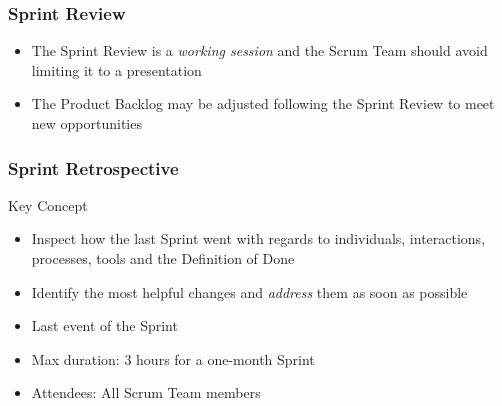 \begin{frame}
	\frametitle{Sprint Review}
	\begin{itemize}
		\setlength\itemsep{0.7em}
		\item The Sprint Review is a \textit{working session} and the Scrum Team should avoid limiting it to a presentation
		\item The Product Backlog may be adjusted following the Sprint Review to meet new opportunities
	\end{itemize}
\end{frame}

\begin{frame}
	\frametitle{Sprint Retrospective}
	\begin{block}{Key Concept}
		\begin{itemize}
			\item Inspect how the last Sprint went with regards to individuals, interactions, processes, tools and the Definition of Done
			\item Identify the most helpful changes and \textit{address} them as soon as possible
		\end{itemize}
	\end{block}
	\vspace{0.5em}
	\begin{itemize}
		\setlength\itemsep{0.7em}
		\item Last event of the Sprint
		\item Max duration: 3 hours for a one-month Sprint
		\item Attendees: All Scrum Team members
	\end{itemize}
\end{frame}